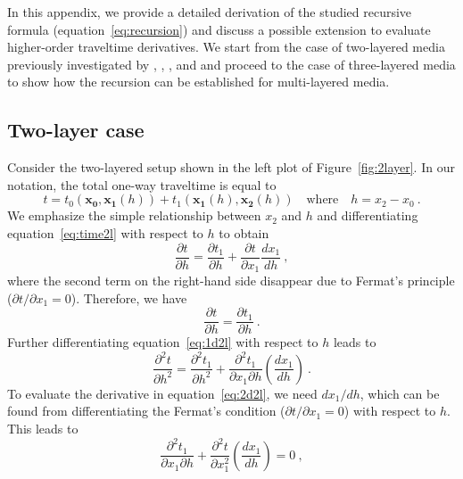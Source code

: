 In this appendix, we provide a detailed derivation of the studied recursive formula (equation~\ref{eq:recursion}) and discuss a possible extension to evaluate higher-order traveltime derivatives. We start from the case of two-layered media previously investigated by \cite{blias1981}, \cite{bliasgrit1984},  \cite{gritsenko}, and \cite{goldin} and proceed to the case of three-layered media to show how the recursion can be established for multi-layered media.

\subsection{Two-layer case}

Consider the two-layered setup shown in the left plot of Figure~\ref{fig:2layer}. In our notation, the total one-way traveltime is equal to
\begin{equation}
\label{eq:time2l}
t = t_0(\mathbf{x_0},\mathbf{x_1}(h)) + t_1(\mathbf{x_1}(h),\mathbf{x_2}(h)) \quad\text{where}\quad h = x_2-x_0~.
\end{equation}
We emphasize the simple relationship between $x_2$ and $h$ and differentiating equation~\ref{eq:time2l} with respect to $h$ to obtain  
\begin{equation}
\frac{\partial t}{\partial h} = \frac{\partial t_1}{\partial h} +  \frac{\partial t}{\partial x_1}  \frac{d x_1}{d h}  ~,
\end{equation}
where the second term on the right-hand side disappear due to Fermat's principle ($\partial t / \partial x_1 = 0$). Therefore, we have 
\begin{equation}
\label{eq:1d2l}
\frac{\partial t}{\partial h} = \frac{\partial t_1}{\partial h}  ~.
\end{equation}
Further differentiating equation~\ref{eq:1d2l} with respect to $h$ leads to
\begin{equation}
\label{eq:2d2l}
\frac{\partial^2 t}{\partial h^2} = \frac{\partial^2 t_1}{\partial h^2} + \frac{\partial^2 t_1}{\partial x_1 \partial h}\left( \frac{d x_1}{d h}\right) ~.
\end{equation}
To evaluate the derivative in equation~\ref{eq:2d2l}, we need $d x_1/d h$, which can be found from differentiating the Fermat's condition ($\partial t/ \partial x_1 = 0$) with respect to $h$. This leads to
\begin{equation}
 \frac{\partial^2 t_1 }{ \partial x_1 \partial h} + \frac{\partial^2 t }{ \partial x_1^2} \left( \frac{d x_1}{d h}\right) = 0~,
\end{equation} 
